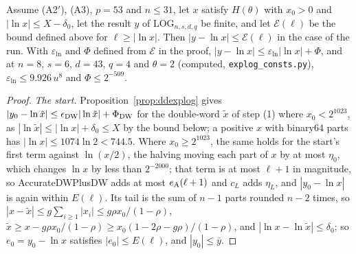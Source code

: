 \begin{theorem}\label{thm:log}
Assume (A2$'$), (A3), $p = 53$ and $n \le 31$, let $x$ satisfy $H(\theta)$ with
$x_0 > 0$ and $|\ln x| \le X - \delta_0$, let the result $y$ of LOG$_{n,s,d,q}$ be finite, and let $\mathcal E(\ell)$ be the bound
defined above for $\ell \ge |\ln x|$.
Then $|y - \ln x| \le \mathcal E(\ell)$ in the case of the run. With $\varepsilon_{\ln}$ and $\Phi$ defined from
$\mathcal E$ in the proof, $|y - \ln x| \le \varepsilon_{\ln}|\ln x| + \Phi$, and at $n = 8$, $s = 6$, $d = 43$, $q
= 4$ and $\theta = 2$ (computed, \texttt{explog\_consts.py}), $\varepsilon_{\ln} \le 9.926\,u^8$ and $\Phi \le
2^{-509}$.
\end{theorem}

\begin{proof}
\emph{The start.} Proposition~\ref{prop:ddexplog} gives $|y_0 - \ln\tilde x| \le \epsilon_{\rm DW}|\ln\tilde x| +
\Phi_{\rm DW}$ for the double-word $\tilde x$ of step (1) where $x_0 < 2^{1023}$, as $|\ln\tilde x| \le |\ln x| +
\delta_0 \le X$ by the bound below; a positive $x$ with binary64 parts has $|\ln x| \le 1074\ln 2 < 744.5$. Where $x_0 \ge 2^{1023}$, the same
holds for the start's first term against $\ln(x/2)$, the halving moving each part of $x$ by at most $\eta_0$, which
changes $\ln x$ by less than $2^{-2000}$; that term is at most $\ell + 1$ in magnitude, so AccurateDWPlusDW adds at most
$e_{\rm A}(\ell + 1)$ and $c_L$ adds $\eta_L$, and $|y_0 - \ln x|$ is again within $E(\ell)$. Its tail is the sum
of $n - 1$ parts rounded $n - 2$ times, so $|x - \tilde x| \le g\sum_{i \ge 1}|x_i| \le g\rho x_0/(1-\rho)$, $\tilde x
\ge x - g\rho x_0/(1 - \rho) \ge x_0(1 - 2\rho - g\rho)/(1 - \rho)$, and $|\ln x - \ln\tilde x| \le \delta_0$; so $e_0 =
y_0 - \ln x$ satisfies $|e_0| \le E(\ell)$, and $|y_0| \le \bar y$.


\end{proof}
